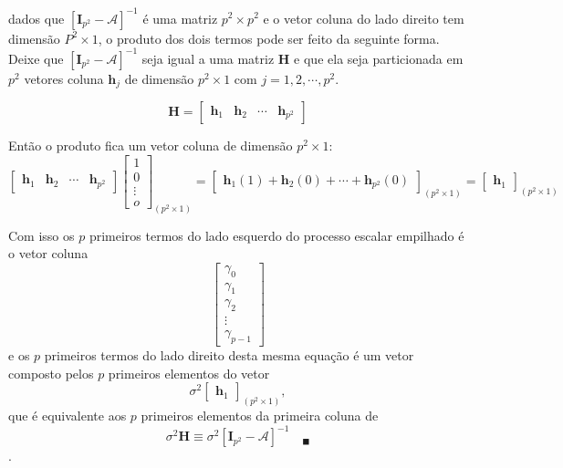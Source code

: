 \begin{enumerate}
	dados que $[\mathbf{I}_{p^2}-\mathbf{\mathscr{A}}]^{-1}$ é uma matriz $p^2\times p^2$ e o vetor coluna do lado direito tem dimensão $P^2 \times 1$, o produto dos dois termos pode ser feito da seguinte forma. Deixe que $[\mathbf{I}_{p^2}-\mathbf{\mathscr{A}}]^{-1}$ seja igual a uma matriz $\mathbf{H}$  e que ela seja particionada em $p^2$ vetores coluna $\mathbf{h}_j$ de dimensão $p^2\times 1$ com $j=1,2,\cdots,p^2$.
	
	$$\mathbf{H}=\begin{bmatrix}
	\mathbf{h}_1&\mathbf{h}_2&\cdots&\mathbf{h}_{p^2}
	\end{bmatrix}$$
	
	Então o produto fica um vetor coluna de dimensão $p^2 \times 1$:
	$$\begin{bmatrix}
	\mathbf{h}_1&\mathbf{h}_2&\cdots&\mathbf{h}_{p^2}
	\end{bmatrix}\begin{bmatrix}
	1\\
	0\\
	\vdots\\
	o
	\end{bmatrix}_{(p^2\times 1)}=\begin{bmatrix}
	\mathbf{h}_1(1)+\mathbf{h}_2(0)+\cdots+\mathbf{h}_{p^2}(0)
	\end{bmatrix}_{(p^2\times 1)}=\begin{bmatrix}
	\mathbf{h}_1
	\end{bmatrix}_{(p^2\times 1)}$$
	
	Com isso os $p$ primeiros termos do lado esquerdo do processo escalar empilhado é o vetor coluna $$\begin{bmatrix}
	\gamma_0\\
	\gamma_1\\
	\gamma_2\\
	\vdots\\
	\gamma_{p-1}
	\end{bmatrix}$$
 e os $p$ primeiros termos do lado direito desta mesma equação é um vetor composto pelos $p$ primeiros elementos do vetor $$\sigma^2\begin{bmatrix}
 \mathbf{h}_1
 \end{bmatrix}_{(p^2\times 1)},$$
 que é equivalente aos $p$ primeiros elementos da primeira coluna de $$\sigma^2\mathbf{H}\equiv\sigma^2[\mathbf{I}_{p^2}-\mathbf{\mathscr{A}}]^{-1}\quad_{\blacksquare}$$.
\end{enumerate}